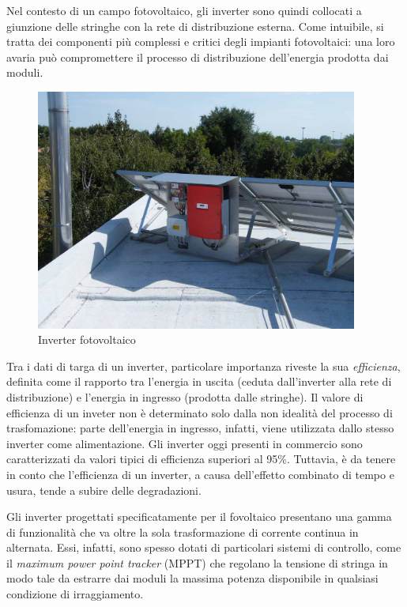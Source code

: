 %
Nel contesto di un campo fotovoltaico, gli inverter sono quindi collocati a 
giunzione delle stringhe con la rete di distribuzione esterna. 
%
Come intuibile, si tratta dei componenti pi\`u complessi e critici degli 
impianti fotovoltaici: una loro avaria pu\`o compromettere il processo di 
distribuzione dell'energia prodotta dai moduli.
%

%
%
\begin{figure}[!h]
\centering
\includegraphics[width=300pt]{img/pv-inverter.jpg}
\caption{Inverter fotovoltaico}
\end{figure}
%
Tra i dati di targa di un inverter, particolare importanza riveste la sua 
\emph{efficienza}, definita come il rapporto tra l'energia in uscita 
(ceduta dall'inverter alla rete di distribuzione) e l'energia in ingresso 
(prodotta dalle stringhe).
%
Il valore di efficienza di un inveter non \`e determinato solo dalla 
non idealit\`a del processo di trasfomazione: parte dell'energia in ingresso, 
infatti, viene utilizzata dallo stesso inverter come alimentazione.
%
Gli inverter oggi presenti in commercio sono caratterizzati da valori tipici di
efficienza superiori al 95\%. Tuttavia, \`e da tenere in conto che l'efficienza 
di un inverter, a causa dell'effetto combinato di tempo e usura, tende a 
subire delle degradazioni.
%

%
Gli inverter progettati specificatamente per il fovoltaico presentano una gamma 
di funzionalit\`a che va oltre la sola trasformazione di corrente continua 
in alternata. Essi, infatti, sono spesso dotati di particolari sistemi di 
controllo, come il \emph{maximum power point tracker} (MPPT) che regolano la tensione 
di stringa in modo tale da estrarre dai moduli la massima potenza disponibile 
in qualsiasi condizione di irraggiamento.
%

